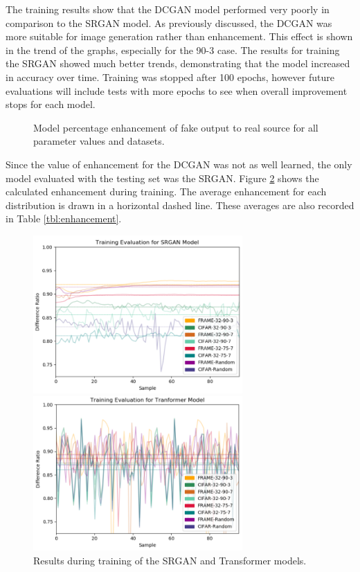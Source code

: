\documentclass[letterpaper]{article} %
\begin{document}
The training results show that the DCGAN model performed very poorly in comparison to the SRGAN model.
As previously discussed, the DCGAN was more suitable for image generation rather than enhancement.
This effect is shown in the trend of the graphs, especially for the 90-3 case.
The results for training the SRGAN showed much better trends,
demonstrating that the model increased in accuracy over time.
Training was stopped after 100 epochs,
however future evaluations will include tests with more epochs to see when overall improvement stops
for each model.

\begin{figure}[htbp]
\caption{Model percentage enhancement of fake output to real source for all parameter values and datasets.}
\label{fig:training}
\end{figure}


Since the value of enhancement for the DCGAN was not as well learned,
the only model evaluated with the testing set was the SRGAN.
Figure \ref{fig:training_results} shows the calculated enhancement
during training.
The average enhancement for each distribution is drawn in
a horizontal dashed line. These averages are also recorded in Table \ref{tbl:enhancement}.

\begin{figure}[htbp]
\centerline{\includegraphics[width=8cm]{srgan_training_results.png}}
\centerline{\includegraphics[width=8cm]{attn_training_results.png}}
\caption{Results during training of the SRGAN and Transformer models.}
\label{fig:training_results}
\end{figure}
\end{document}
